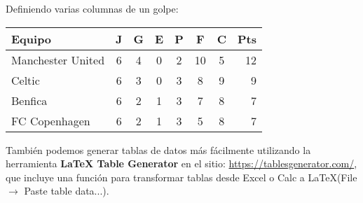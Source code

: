 \documentclass[10pt,letterpaper]{article}
\begin{document}
\vspace{1cm}

Definiendo varias columnas de un golpe:\\
\begin{tabular}{l*{6}{c}r}
	Equipo           & J & G & E & P & F  & C & Pts \\
	\hline
	Manchester United & 6 & 4 & 0 & 2 & 10 & 5 & 12  \\
	Celtic            & 6 & 3 & 0 & 3 &  8 & 9 &  9  \\
	Benfica           & 6 & 2 & 1 & 3 &  7 & 8 &  7  \\
	FC Copenhagen     & 6 & 2 & 1 & 3 &  5 & 8 &  7  \\
\end{tabular}

\vspace{1cm}

También podemos generar tablas de datos más fácilmente utilizando la he\-rra\-mienta \textbf{LaTeX Table Generator} en el sitio: \url{https://tablesgenerator.com/}, que incluye una función para transformar tablas desde Excel o Calc a \LaTeX (File $\rightarrow$ Paste table data...).
\end{document}

